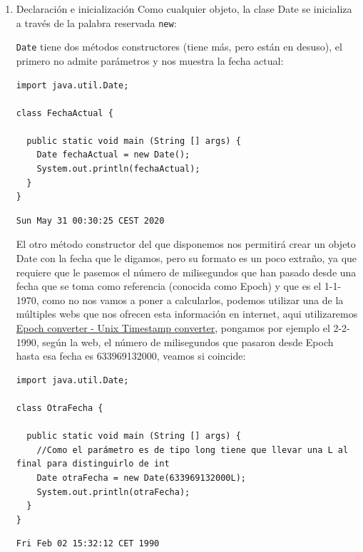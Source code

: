 \documentclass[11pt]{article}
\begin{document}
\begin{enumerate}
\item Declaración e inicialización
\label{sec:orgca3761b}
Como cualquier objeto, la clase Date se inicializa a través de la palabra reservada \texttt{new}:

\texttt{Date} tiene dos métodos constructores (tiene más, pero están en desuso), el primero no admite parámetros y nos muestra la fecha actual:

\begin{verbatim}
import java.util.Date;

class FechaActual {

  public static void main (String [] args) {
    Date fechaActual = new Date();
    System.out.println(fechaActual);
  }
}
\end{verbatim}

\begin{verbatim}
Sun May 31 00:30:25 CEST 2020
\end{verbatim}


El otro método constructor del que disponemos nos permitirá crear un objeto Date con la fecha que le digamos, pero su formato es un poco extraño, ya que requiere que le pasemos el número de milisegundos que han pasado desde una fecha que se toma como referencia (conocida como Epoch) y que es el 1-1-1970, como no nos vamos a poner a calcularlos, podemos utilizar una de la múltiples webs que nos ofrecen esta información en internet, aqui utilizaremos \href{https://www.epochconverter.com}{Epoch converter - Unix Timestamp converter}, pongamos por ejemplo el 2-2-1990, según la web, el número de milisegundos que pasaron desde Epoch hasta esa fecha es 633969132000, veamos si coincide:

\begin{verbatim}
import java.util.Date;

class OtraFecha {

  public static void main (String [] args) {
    //Como el parámetro es de tipo long tiene que llevar una L al final para distinguirlo de int
    Date otraFecha = new Date(633969132000L);
    System.out.println(otraFecha);
  }
}
\end{verbatim}

\begin{verbatim}
Fri Feb 02 15:32:12 CET 1990
\end{verbatim}


\end{enumerate}
\end{document}
